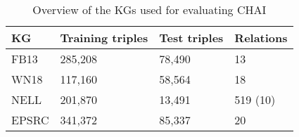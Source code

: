 \begin{table}[htp]
    \begin{center}
    \begin{tabular}{ M{2.5cm} | M{2.5cm} | M{2.5cm} | M{2cm} } 
    \centering \textbf{KG} & \textbf{Training triples} & \textbf{Test triples} & \textbf{Relations} \\
    \hline
    FB13 & 285,208 & 78,490 & 13 \\ 
    \hline 
    WN18 & 117,160 & 58,564 & 18 \\
    \hline 
    NELL & 201,870 & 13,491 & 519 (10) \\
    \hline 
    EPSRC & 341,372 & 85,337 & 20 \\
    \end{tabular}
    \caption{Overview of the KGs used for evaluating CHAI}
    \label{table:chai-datasets}
    \end{center}
\end{table}